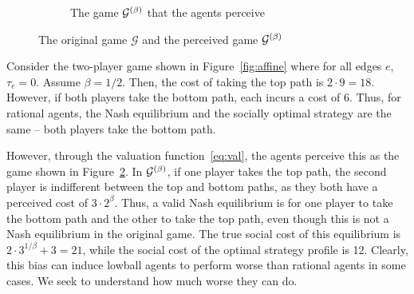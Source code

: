 \documentclass[twoside]{article}
\begin{document}
\begin{multicols}{2}
\begin{figure}[H]
\begin{subfigure}[b]{\linewidth}
    \caption{The game $\mathcal{G}^{(\beta)}$ that the agents perceive}
    \label{fig:affinebet}
  \end{subfigure}
  \caption{The original game $\mathcal{G}$ and the perceived game
  $\mathcal{G}^{(\beta)}$}
\end{figure}
Consider the two-player game shown in Figure~\ref{fig:affine} where for all edges $e$, $\tau_e = 0$. Assume $\beta =
1/2$. Then, the cost of taking the top path is $2 \cdot 9 = 18$. However, if
both players take the bottom path, each incurs a cost of 6. Thus, for rational
agents, the Nash equilibrium and the socially optimal strategy are the same --
both players take the bottom path.

However, through the valuation function~\eqref{eq:val}, the agents perceive this
as the game shown in Figure~\ref{fig:affinebet}. In $\mathcal{G}^{(\beta)}$, if one
player takes the top path, the second player is indifferent between the top and
bottom paths, as they both have a perceived cost of $3 \cdot 2^\beta$. Thus, a
valid Nash equilibrium is for one player to take the bottom path and the other
to take the top path, even though this is not a Nash equilibrium in the original
game. The true social cost of this equilibrium is $2 \cdot 3^{1/\beta} + 3 =
21$, while the social cost of the optimal strategy profile is 12. Clearly, this
bias can induce lowball agents to perform worse than rational agents in some
cases. We seek to understand how much worse they can do.


\end{multicols}
\end{document}
